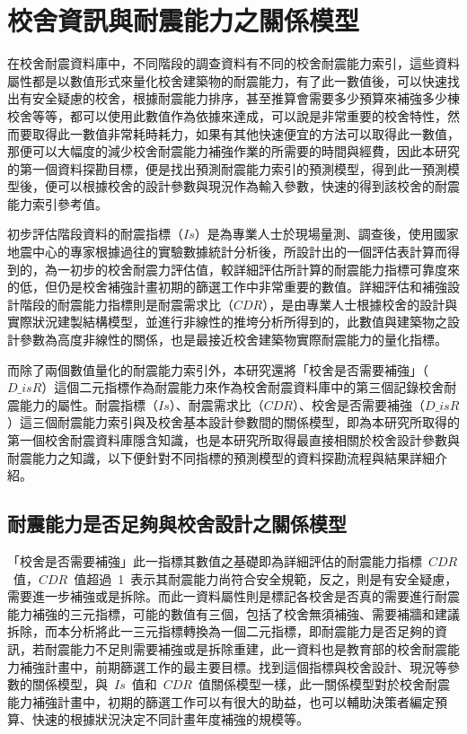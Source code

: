 \renewcommand\thetable{\arabic{chapter}-\arabic{table}}
\chapter{校舍資訊與耐震能力之關係模型}

在校舍耐震資料庫中，不同階段的調查資料有不同的校舍耐震能力索引，這些資料屬性都是以數值形式來量化校舍建築物的耐震能力，有了此一數值後，可以快速找出有安全疑慮的校舍，根據耐震能力排序，甚至推算會需要多少預算來補強多少棟校舍等等，都可以使用此數值作為依據來達成，可以說是非常重要的校舍特性，然而要取得此一數值非常耗時耗力，如果有其他快速便宜的方法可以取得此一數值，那便可以大幅度的減少校舍耐震能力補強作業的所需要的時間與經費，因此本研究的第一個資料探勘目標，便是找出預測耐震能力索引的預測模型，得到此一預測模型後，便可以根據校舍的設計參數與現況作為輸入參數，快速的得到該校舍的耐震能力索引參考值。

初步評估階段資料的耐震指標（$Is$）是為專業人士於現場量測、調查後，使用國家地震中心的專家根據過往的實驗數據統計分析後，所設計出的一個評估表計算而得到的，為一初步的校舍耐震力評估值，較詳細評估所計算的耐震能力指標可靠度來的低，但仍是校舍補強計畫初期的篩選工作中非常重要的數值。詳細評估和補強設計階段的耐震能力指標則是耐震需求比（$CDR$），是由專業人士根據校舍的設計與實際狀況建製結構模型，並進行非線性的推垮分析所得到的，此數值與建築物之設計參數為高度非線性的關係，也是最接近校舍建築物實際耐震能力的量化指標。

而除了兩個數值量化的耐震能力索引外，本研究還將「校舍是否需要補強」（$D\_isR$）這個二元指標作為耐震能力來作為校舍耐震資料庫中的第三個記錄校舍耐震能力的屬性。耐震指標（$Is$）、耐震需求比（$CDR$）、校舍是否需要補強（$D\_isR$）這三個耐震能力索引與及校舍基本設計參數間的關係模型，即為本研究所取得的第一個校舍耐震資料庫隱含知識，也是本研究所取得最直接相關於校舍設計參數與耐震能力之知識，以下便針對不同指標的預測模型的資料探勘流程與結果詳細介紹。


\section{耐震能力是否足夠與校舍設計之關係模型}

「校舍是否需要補強」此一指標其數值之基礎即為詳細評估的耐震能力指標~$CDR$~值，$CDR$~值超過~1~表示其耐震能力尚符合安全規範，反之，則是有安全疑慮，需要進一步補強或是拆除。而此一資料屬性則是標記各校舍是否真的需要進行耐震能力補強的三元指標，可能的數值有三個，包括了校舍無須補強、需要補牆和建議拆除，而本分析將此一三元指標轉換為一個二元指標，即耐震能力是否足夠的資訊，若耐震能力不足則需要補強或是拆除重建，此一資料也是教育部的校舍耐震能力補強計畫中，前期篩選工作的最主要目標。找到這個指標與校舍設計、現況等參數的關係模型，與~$Is$~值和~$CDR$~值關係模型一樣，此一關係模型對於校舍耐震能力補強計畫中，初期的篩選工作可以有很大的助益，也可以輔助決策者編定預算、快速的根據狀況決定不同計畫年度補強的規模等。

